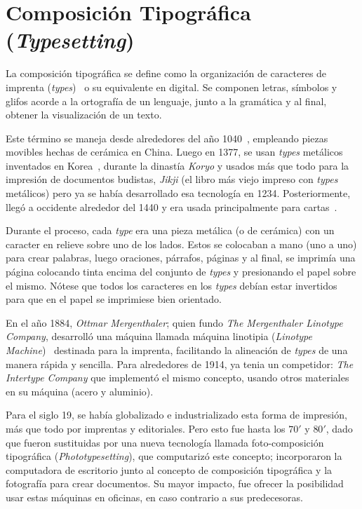 \documentclass[12pt,letterpaper,titlepage,oneside,openright]{book}
\begin{document}
\section{Composición Tipográfica (\textit{Typesetting})}

La composición tipográfica se define como la organización de caracteres de imprenta (\textit{types})~\cite{eckersley2008glossary} o su equivalente en digital. Se componen letras, símbolos y glifos acorde a la ortografía de un lenguaje, junto a la gramática y al final, obtener la visualización de un texto.

Este término se maneja desde alrededores del año 1040~\cite{needham1995shorter}, empleando piezas movibles hechas de cerámica en China. Luego en 1377, se usan \textit{types} metálicos inventados en Korea~\cite{sohn1959early}, durante la dinastía \textit{Koryo} y usados más que todo para la impresión de documentos budistas, \textit{Jikji} (el libro más viejo impreso con \textit{types} metálicos) pero ya se había desarrollado esa tecnología en 1234. Posteriormente, llegó a occidente alrededor del 1440 y era usada principalmente para cartas~\cite{eisenstein2005printing}.

Durante el proceso, cada \textit{type} era una pieza metálica (o de cerámica) con un caracter en relieve sobre uno de los lados. Estos se colocaban a mano (uno a uno) para crear palabras, luego oraciones, párrafos, páginas y al final, se imprimía una página colocando tinta encima del conjunto de \textit{types} y presionando el papel sobre el mismo. Nótese que todos los caracteres en los \textit{types} debían estar invertidos para que en el papel se imprimiese bien orientado.

En el año 1884, \textit{Ottmar Mergenthaler}; quien fundo \textit{The Mergenthaler Linotype Company}, desarrolló una máquina llamada máquina linotipia (\textit{Linotype Machine})~\cite{weblinotype} destinada para la imprenta, facilitando la alineación de \textit{types} de una manera rápida y sencilla. Para alrededores de 1914, ya tenia un competidor: \textit{The Intertype Company} que implementó el mismo concepto, usando otros materiales en su máquina (acero y aluminio).

Para el siglo 19, se había globalizado e industrializado esta forma de impresión, más que todo por imprentas y editoriales. Pero esto fue hasta los $70'$ y $80'$, dado que fueron sustituidas por una nueva tecnología llamada foto-composición tipográfica (\textit{Phototypesetting}), que computarizó este concepto; incorporaron la computadora de escritorio junto al concepto de composición tipográfica y la fotografía para crear documentos. Su mayor impacto, fue ofrecer la posibilidad usar estas máquinas en oficinas, en caso contrario a sus predecesoras.
\end{document}

